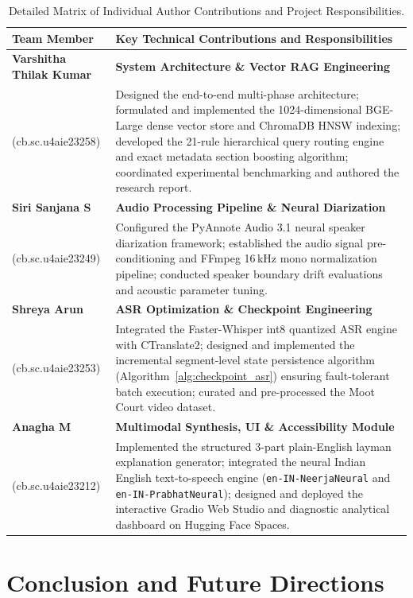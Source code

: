 \documentclass{llncs}
\begin{document}
\begin{table}[htbp]
\caption{Detailed Matrix of Individual Author Contributions and Project Responsibilities.}
\label{tab:author_contributions}
\centering
\small
\begin{tabularx}{\textwidth}{lX}
\toprule
\textbf{Team Member} & \textbf{Key Technical Contributions and Responsibilities} \\
\midrule
\textbf{Varshitha Thilak Kumar} & \textbf{System Architecture \& Vector RAG Engineering} \\
(cb.sc.u4aie23258) & Designed the end-to-end multi-phase architecture; formulated and implemented the 1024-dimensional BGE-Large dense vector store and ChromaDB HNSW indexing; developed the 21-rule hierarchical query routing engine and exact metadata section boosting algorithm; coordinated experimental benchmarking and authored the research report. \\
\addlinespace
\textbf{Siri Sanjana S} & \textbf{Audio Processing Pipeline \& Neural Diarization} \\
(cb.sc.u4aie23249) & Configured the PyAnnote Audio 3.1 neural speaker diarization framework; established the audio signal pre-conditioning and FFmpeg 16\,kHz mono normalization pipeline; conducted speaker boundary drift evaluations and acoustic parameter tuning. \\
\addlinespace
\textbf{Shreya Arun} & \textbf{ASR Optimization \& Checkpoint Engineering} \\
(cb.sc.u4aie23253) & Integrated the Faster-Whisper int8 quantized ASR engine with CTranslate2; designed and implemented the incremental segment-level state persistence algorithm (Algorithm~\ref{alg:checkpoint_asr}) ensuring fault-tolerant batch execution; curated and pre-processed the Moot Court video dataset. \\
\addlinespace
\textbf{Anagha M} & \textbf{Multimodal Synthesis, UI \& Accessibility Module} \\
(cb.sc.u4aie23212) & Implemented the structured 3-part plain-English layman explanation generator; integrated the neural Indian English text-to-speech engine (\texttt{en-IN-NeerjaNeural} and \texttt{en-IN-PrabhatNeural}); designed and deployed the interactive Gradio Web Studio and diagnostic analytical dashboard on Hugging Face Spaces. \\
\bottomrule
\end{tabularx}
\end{table}


\section{Conclusion and Future Directions}
\label{sec:conclusion}
\end{document}
